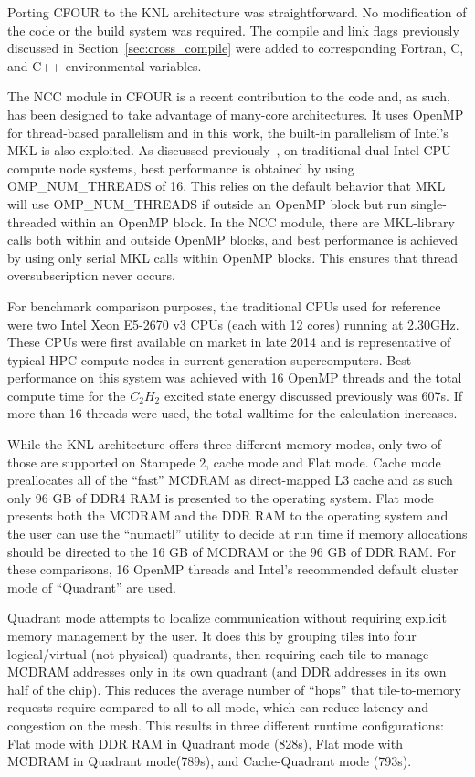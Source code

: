 Porting CFOUR to the KNL architecture was straightforward. No modification of the code or the build
system was required. The compile and link flags previously discussed in Section~\ref{sec:cross_compile}
were added to corresponding Fortran, C, and C++ environmental variables.

The NCC module in CFOUR is a recent contribution to the code and, as such, has been designed to take
advantage of many-core architectures. It uses OpenMP for thread-based parallelism and in this work, the
built-in parallelism of Intel's MKL is also exploited. As discussed previously~\cite{ncc:15},
on traditional dual Intel CPU compute node systems, best performance is obtained
by using OMP\_NUM\_THREADS of 16. This relies on the default behavior that MKL will use OMP\_NUM\_THREADS
if outside an OpenMP block but run single-threaded within an OpenMP block.
In the NCC module, there are MKL-library calls both within and outside OpenMP blocks, and best performance is
achieved by using only serial MKL calls within OpenMP blocks. This ensures that thread oversubscription never occurs.

For benchmark comparison purposes, the traditional CPUs used for reference were two Intel Xeon E5-2670 v3 CPUs
(each with 12 cores) running at 2.30GHz. These CPUs were first available on market in late 2014 and is
representative of typical HPC compute nodes in current generation supercomputers. Best performance on this
system was achieved with 16 OpenMP threads and the total compute time for the $C_2H_2$ excited state energy
discussed previously was 607s.
If more than 16 threads were used, the total walltime for the calculation increases.

While the KNL architecture offers three different memory modes, only two of those are supported on Stampede 2,
cache mode and Flat mode. Cache mode preallocates all of the ``fast'' MCDRAM as direct-mapped L3 cache and
as such only 96 GB of DDR4 RAM is presented to the operating system. Flat mode presents both the MCDRAM and the
DDR RAM to the operating system and the user can use the ``numactl'' utility to decide at run time if memory
allocations should be directed to the 16 GB of MCDRAM or the 96 GB of DDR RAM. For these comparisons, 16 OpenMP
threads and Intel's recommended default cluster mode of ``Quadrant'' are used.

Quadrant mode attempts to localize communication without requiring explicit memory management by the user.
It does this by grouping tiles into four logical/virtual (not physical) quadrants, then requiring each tile
to manage MCDRAM addresses only in its own quadrant (and DDR addresses in its own half of the chip).
This reduces the average number of ``hops'' that tile-to-memory requests require compared to all-to-all mode,
which can reduce latency and congestion on the mesh. This results in three different runtime configurations:
Flat mode with DDR RAM in Quadrant mode (828s), Flat mode with MCDRAM in Quadrant mode(789s), and
Cache-Quadrant mode (793s).

